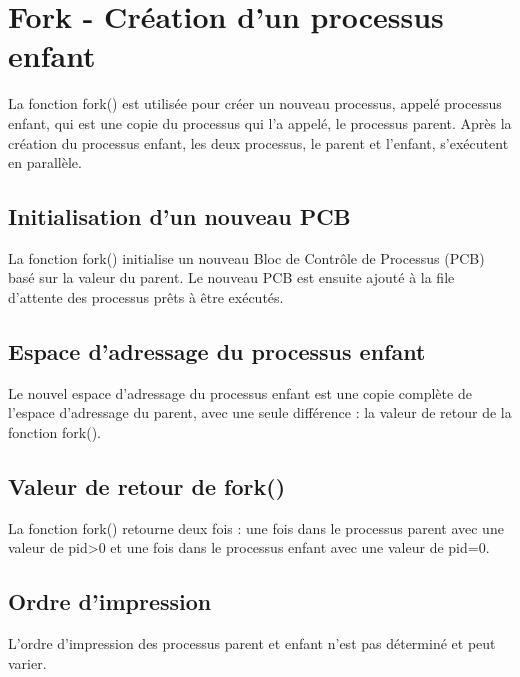 \documentclass[12pt]{report}
\begin{document}
\section{Fork - Création d'un processus enfant} 
 La fonction fork() est utilisée pour créer un nouveau processus, appelé processus enfant, qui est une copie du processus qui l'a appelé, le processus parent. Après la création du processus enfant, les deux processus, le parent et l'enfant, s'exécutent en parallèle. 

 \subsection{Initialisation d'un nouveau PCB} 
 La fonction fork() initialise un nouveau Bloc de Contrôle de Processus (PCB) basé sur la valeur du parent. Le nouveau PCB est ensuite ajouté à la file d'attente des processus prêts à être exécutés. 

 \subsection{Espace d'adressage du processus enfant} 
 Le nouvel espace d'adressage du processus enfant est une copie complète de l'espace d'adressage du parent, avec une seule différence : la valeur de retour de la fonction fork(). 

 \subsection{Valeur de retour de fork()} 
 La fonction fork() retourne deux fois : une fois dans le processus parent avec une valeur de pid>0 et une fois dans le processus enfant avec une valeur de pid=0. 

 \subsection{Ordre d'impression} 
 L'ordre d'impression des processus parent et enfant n'est pas déterminé et peut varier. 
\end{document}
